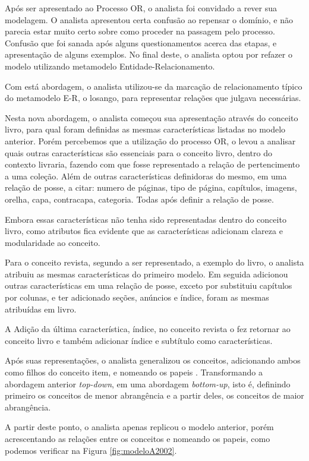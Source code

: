 Após ser apresentado ao Processo OR, o analista foi convidado a rever sua modelagem. O analista apresentou certa confusão ao repensar o domínio, e não parecia estar muito certo sobre como proceder na passagem pelo processo. Confusão que foi sanada após alguns questionamentos acerca das etapas, e apresentação de alguns exemplos. No final deste, o analista optou por refazer o modelo utilizando metamodelo Entidade-Relacionamento.

Com está abordagem, o analista utilizou-se da marcação de relacionamento típico do metamodelo E-R, o losango, para representar relações que julgava necessárias. 

Nesta nova abordagem, o analista começou sua apresentação através do conceito livro, para qual foram definidas as mesmas características listadas no modelo anterior. Porém percebemos que a utilização do processo OR, o levou a analisar quais outras características são essenciais para o conceito livro, dentro do contexto livraria,  fazendo com que fosse representado a relação de pertencimento a uma coleção. Além de outras características definidoras do mesmo, em uma relação de posse, a citar: numero de páginas, tipo de página, capítulos, imagens, orelha, capa, contracapa, categoria. Todas após definir a relação de posse.

Embora essas características não tenha sido representadas dentro do conceito livro, como atributos fica evidente que as características adicionam clareza e modularidade ao conceito.

Para o conceito revista, segundo a ser representado, a exemplo do livro, o analista atribuiu as mesmas características do primeiro modelo. Em seguida adicionou outras características em uma relação de posse, exceto por substituiu capítulos por colunas, e ter adicionado seções, anúncios e índice, foram as mesmas atribuídas em livro. 

A Adição da última característica, índice, no conceito revista o fez retornar ao conceito livro e também adicionar índice e subtítulo como características.

Após suas representações, o analista generalizou os conceitos, adicionando ambos como filhos do conceito item, e nomeando os papeis . Transformando a abordagem anterior \textit{top-down},  em uma abordagem \textit{bottom-up}, isto é, definindo primeiro os conceitos de menor abrangência e a partir deles, os conceitos de maior abrangência.

A partir deste ponto, o analista apenas replicou o modelo anterior, porém acrescentando as relações entre os conceitos e nomeando os papeis, como podemos verificar na Figura \ref{fig:modeloA2002}.

